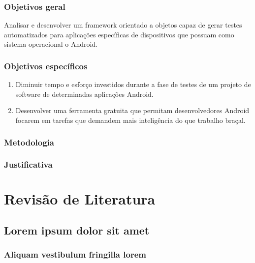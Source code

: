 \documentclass[
  12pt,       %
  openright,      %
  twoside,      %
  a4paper,      %
  english,      %
  french,       %
  spanish,      %
  brazil,       %
  ]{abntex2}
\begin{document}
\section{Objetivos geral}
    Analisar e desenvolver um framework orientado a objetos capaz de gerar testes automatizados para
    aplicações específicas de dispositivos que possuam como sistema operacional o Android.

\section{Objetivos específicos}
\begin{enumerate}
    \item Diminuir tempo e esforço investidos durante a fase de testes de um projeto de software
          de determinadas aplicações Android.
    \item Desenvolver uma ferramenta gratuita que permitam desenvolvedores Android focarem
          em tarefas que demandem mais inteligência do que trabalho braçal.
\end{enumerate}

\section{Metodologia}

\section{Justificativa}



\part{Revisão de Literatura}

\chapter{Lorem ipsum dolor sit amet}

\section{Aliquam vestibulum fringilla lorem}
\end{document}
